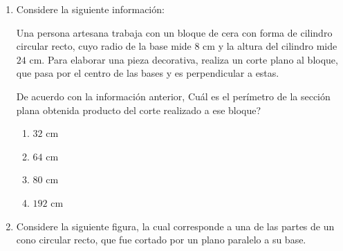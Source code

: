 \documentclass[12pt]{article}
\begin{document}
\begin{enumerate}[label=\textbf{\arabic*.}, itemsep=2.5cm]
\begin{enumerate}[label=\Alph*)]
  \item circunferencia.
  \item hiperbola.
  \item parabola.
  \item recta.
\end{enumerate}

\Needspace{0.48\textheight}
\item
Considere la siguiente informaci\'on:

Una persona artesana trabaja con un bloque de cera con forma de cilindro circular recto, cuyo radio de la base mide $8$ cm y la altura del cilindro mide $24$ cm. Para elaborar una pieza decorativa, realiza un corte plano al bloque, que pasa por el centro de las bases y es perpendicular a estas.

De acuerdo con la informaci\'on anterior, \textquestiondown Cu\'al es el per\'imetro de la secci\'on plana obtenida producto del corte realizado a ese bloque?

\begin{enumerate}[label=\Alph*)]
  \item $32$ cm
  \item $64$ cm
  \item $80$ cm
  \item $192$ cm
\end{enumerate}

\Needspace{0.88\textheight}
\item
Considere la siguiente figura, la cual corresponde a una de las partes de un cono circular recto, que fue cortado por un plano paralelo a su base.

\begin{center}
\end{center}


\end{enumerate}
\end{document}
